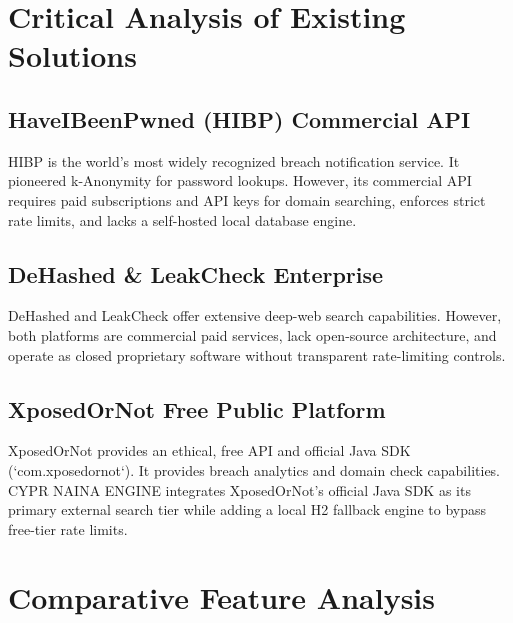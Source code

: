 \documentclass[12pt,a4paper,oneside]{report}
\begin{document}
\section{Critical Analysis of Existing Solutions}

\subsection{HaveIBeenPwned (HIBP) Commercial API}
HIBP is the world's most widely recognized breach notification service. It pioneered k-Anonymity for password lookups. However, its commercial API requires paid subscriptions and API keys for domain searching, enforces strict rate limits, and lacks a self-hosted local database engine.

\subsection{DeHashed & LeakCheck Enterprise}
DeHashed and LeakCheck offer extensive deep-web search capabilities. However, both platforms are commercial paid services, lack open-source architecture, and operate as closed proprietary software without transparent rate-limiting controls.

\subsection{XposedOrNot Free Public Platform}
XposedOrNot provides an ethical, free API and official Java SDK (`com.xposedornot`). It provides breach analytics and domain check capabilities. CYPR NAINA ENGINE integrates XposedOrNot's official Java SDK as its primary external search tier while adding a local H2 fallback engine to bypass free-tier rate limits.

\section{Comparative Feature Analysis}
\end{document}
